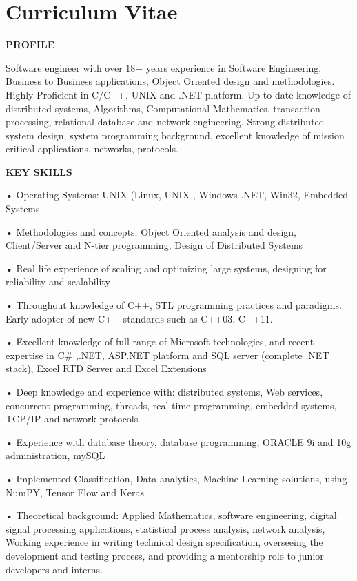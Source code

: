 ﻿\chapter*{Curriculum	Vitae}

\textbf{PROFILE}

Software engineer with over 18+ years experience in Software Engineering, Business to Business applications, Object Oriented design and methodologies. Highly Proficient in C/C++, UNIX and .NET platform. Up to date knowledge of distributed systems, Algorithms, Computational Mathematics, transaction processing, relational database and network engineering. Strong distributed system design, system programming background, excellent knowledge of mission critical applications, networks, protocols. 

\textbf{KEY SKILLS}

    • Operating Systems: UNIX (Linux, UNIX , Windows .NET,  Win32, Embedded Systems

    • Methodologies and concepts: Object Oriented analysis and design, Client/Server and N-tier programming, Design of Distributed  Systems

    • Real life experience of scaling and optimizing large systems, designing for reliability and scalability

    • Throughout knowledge of C++, STL programming practices and paradigms. Early adopter of new C++ standards such as C++03, C++11.

    • Excellent knowledge of full range of Microsoft technologies, and recent expertise in  C\# ,.NET,  ASP.NET platform and SQL server (complete .NET stack), Excel RTD Server and Excel Extensions

    • Deep knowledge and experience with: distributed systems, Web services, concurrent programming, threads, real time programming,  embedded systems, TCP/IP and network protocols

    • Experience with database theory, database programming, ORACLE 9i and 10g administration, mySQL

    • Implemented Classification, Data analytics,  Machine Learning solutions, using NumPY, Tensor Flow and Keras

    • Theoretical background: Applied Mathematics, software engineering, digital signal processing applications, statistical process analysis, network analysis, Working experience in writing technical design specification, overseeing the development and testing process, and providing a mentorship role to junior developers and interns.

